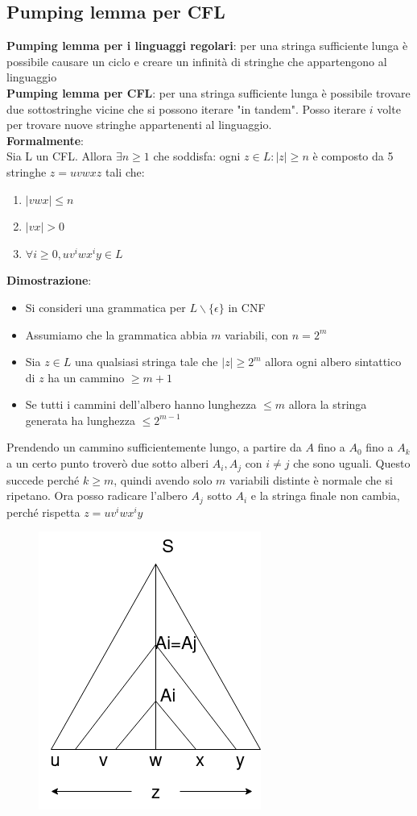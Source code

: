 \documentclass[12pt]{article}
\begin{document}
\subsection{Pumping lemma per CFL}
\textbf{Pumping lemma per i linguaggi regolari}: per una stringa sufficiente lunga è possibile causare un ciclo e creare un infinità di stringhe che appartengono al linguaggio 
\\ \textbf{Pumping lemma per CFL}: per una stringa sufficiente lunga è possibile trovare due sottostringhe vicine che si possono iterare "in tandem". Posso iterare $i$ volte per trovare nuove stringhe appartenenti al linguaggio.
\\ \textbf{Formalmente}: 
\\ Sia L un CFL. Allora $\exists n \geq 1$ che soddisfa: ogni $z \in L: |z| \geq n$ è composto da 5 stringhe $z=uvwxz$ tali che: 
\begin{enumerate}
  \item $|vwx| \leq n$
  \item $|vx| > 0$
  \item $\forall i \geq 0, uv^i wx^i y \in L$
\end{enumerate}
\textbf{Dimostrazione}: 
\begin{itemize}
  \item Si consideri una grammatica per $ L \backslash \{\epsilon\}$ in CNF
  \item Assumiamo che la grammatica abbia $m$ variabili, con $n=2^m$
  \item Sia $z \in L$ una qualsiasi stringa tale che $|z| \geq 2^m$ allora ogni albero sintattico di $z$ ha un cammino $\geq m + 1$
  \item Se tutti i cammini dell'albero hanno lunghezza $\leq m$ allora la stringa generata ha lunghezza $\leq 2^{m-1}$
\end{itemize}
Prendendo un cammino sufficientemente lungo, a partire da $A$ fino a $A_0$ fino a $A_k$ a un certo punto troverò due sotto alberi $A_i, A_j$ con $i\neq j$ che sono uguali.
Questo succede perché $k \geq m$, quindi avendo solo $m$ variabili distinte è normale che si ripetano.
Ora posso radicare l'albero $A_j$ sotto $A_i$ e la stringa finale non cambia, perché rispetta $z=uv^i wx^i y$
\begin{figure}[ht]
	\includegraphics[scale = 0.4]{media/tree.png}
	\centering
\end{figure}
\end{document}
